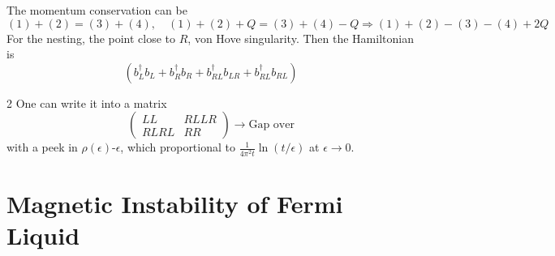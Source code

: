 The momentum conservation can be
\[
  (1) + (2) = (3) + (4), \quad
  (1) + (2) + Q = (3) + (4) - Q \Rightarrow
  (1) + (2) - (3) - (4) + 2Q
\]
For the nesting, the point close to $R$, von Hove singularity.
Then the Hamiltonian is
\[
  (b_L^\dagger b_L + b_R^\dagger b_R + b_{RL}^\dagger b_{LR}
+ b_{RL}^\dagger b_{RL})
\]
\begin{paracol}{2}
One can write it into a matrix
\[
  \begin{pmatrix}
    LL & RLLR\\
    RLRL & RR
  \end{pmatrix} \to \text{Gap over}
\]
with a peek in $\rho(\epsilon)$-$\epsilon$, which proportional
to $\frac{1}{4\pi^2t}\ln(t/\epsilon)$ at $\epsilon \to 0$.
\switchcolumn \centering
{}
\end{paracol}

\section{Magnetic Instability of Fermi Liquid}

